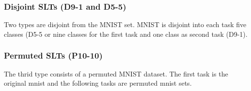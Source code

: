 \subsubsection*{Disjoint SLTs (D9-1 and D5-5)}

Two types are disjoint from the MNIST set.
MNIST is disjoint into each task five classes (D5-5 or nine classes for the first task and one class as second task (D9-1).

\subsubsection*{Permuted SLTs (P10-10)}

The thrid type consists of a permuted MNIST dataset.
The first task is the original mnist and the following tasks are permuted mnist sets.

\iffalse

- since the paper shows poorly benchmarks parameters this article sticks with the best suited network for the mnist dataset
- moreover is relies on the application-oriented study, where a batch size of 100 with 2500 iteration together with the two disjoint and on permuted type and two tasks where used.

\fi